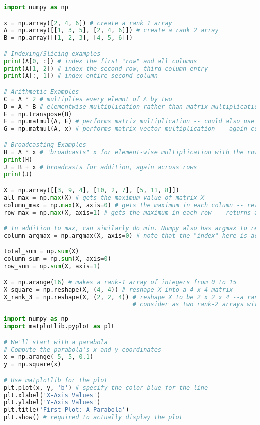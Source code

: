 \documentclass[11pt, a4paper]{article}
\begin{document}
\begin{lstlisting}[language=Python, caption=NumPy]
import numpy as np

x = np.array([2, 4, 6]) # create a rank 1 array
A = np.array([[1, 3, 5], [2, 4, 6]]) # create a rank 2 array
B = np.array([[1, 2, 3], [4, 5, 6]])

# Indexing/Slicing examples
print(A[0, :]) # index the first "row" and all columns
print(A[1, 2]) # index the second row, third column entry
print(A[:, 1]) # index entire second column

# Arithmetic Examples
C = A * 2 # multiplies every elemnt of A by two
D = A * B # elementwise multiplication rather than matrix multiplication
E = np.transpose(B)
F = np.matmul(A, E) # performs matrix multiplication -- could also use np.dot()
G = np.matmul(A, x) # performs matrix-vector multiplication -- again could also use np.dot()

# Broadcasting Examples
H = A * x # "broadcasts" x for element-wise multiplication with the rows of A
print(H)
J = B + x # broadcasts for addition, again across rows
print(J)

X = np.array([[3, 9, 4], [10, 2, 7], [5, 11, 8]])
all_max = np.max(X) # gets the maximum value of matrix X
column_max = np.max(X, axis=0) # gets the maximum in each column -- returns a rank-1 array [10, 11, 8]
row_max = np.max(X, axis=1) # gets the maximum in each row -- returns a rank-1 array [9, 10, 11]

# In addition to max, can similarly do min. Numpy also has argmax to return indices of maximal values
column_argmax = np.argmax(X, axis=0) # note that the "index" here is actually the row the maximum occurs for each column

total_sum = np.sum(X)
column_sum = np.sum(X, axis=0)
row_sum = np.sum(X, axis=1)

X = np.arange(16) # makes a rank-1 array of integers from 0 to 15
X_square = np.reshape(X, (4, 4)) # reshape X into a 4 x 4 matrix
X_rank_3 = np.reshape(X, (2, 2, 4)) # reshape X to be 2 x 2 x 4 --a rank-3 array
                                    # consider as two rank-2 arrays with 2 rows and 4 columns

\end{lstlisting}

\begin{lstlisting}[language=Python, caption=MatPlotLib.PyPlot]
import numpy as np
import matplotlib.pyplot as plt

# We'll start with a parabola
# Compute the parabola's x and y coordinates
x = np.arange(-5, 5, 0.1)
y = np.square(x)

# Use matplotlib for the plot
plt.plot(x, y, 'b') # specify the color blue for the line
plt.xlabel('X-Axis Values')
plt.ylabel('Y-Axis Values')
plt.title('First Plot: A Parabola')
plt.show() # required to actually display the plot
\end{lstlisting}
\end{document}
